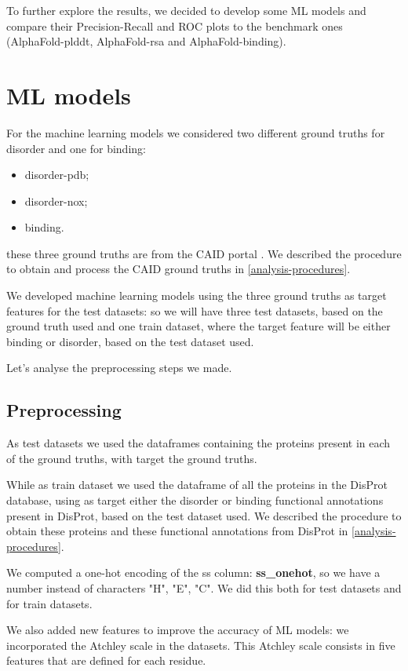 To further explore the results, we decided to develop some ML models and compare their Precision-Recall and ROC plots to the benchmark ones (AlphaFold-plddt, AlphaFold-rsa and AlphaFold-binding).

\section{ML models}
For the machine learning models we considered two different ground truths for disorder and one for binding:
\begin{itemize}
    \item disorder-pdb;
    \item disorder-nox;
    \item binding.
\end{itemize}
these three ground truths are from the CAID portal \cite{caid}. We described the procedure to obtain and process the CAID ground truths in \ref{analysis-procedures}.

We developed machine learning models using the three ground truths as target features for the test datasets: so we will have three test datasets, based on the ground truth used and one train dataset, where the target feature will be either binding or disorder, based on the test dataset used.

Let's analyse the preprocessing steps we made.

\vspace{5em}

\subsection{Preprocessing}
As test datasets we used the dataframes containing the proteins present in each of the ground truths, with target the ground truths.

While as train dataset we used the dataframe of all the proteins in the DisProt database, using as target either the disorder or binding functional annotations present in DisProt, based on the test dataset used. We described the procedure to obtain these proteins and these functional annotations from DisProt in \ref{analysis-procedures}.

We computed a one-hot encoding of the ss column: \textbf{ss\_onehot}, so we have a number instead of characters "H", "E", "C". We did this both for test datasets and for train datasets. 

We also added new features to improve the accuracy of ML models: we incorporated the Atchley scale in the datasets. This Atchley scale consists in five features that are defined for each residue.

